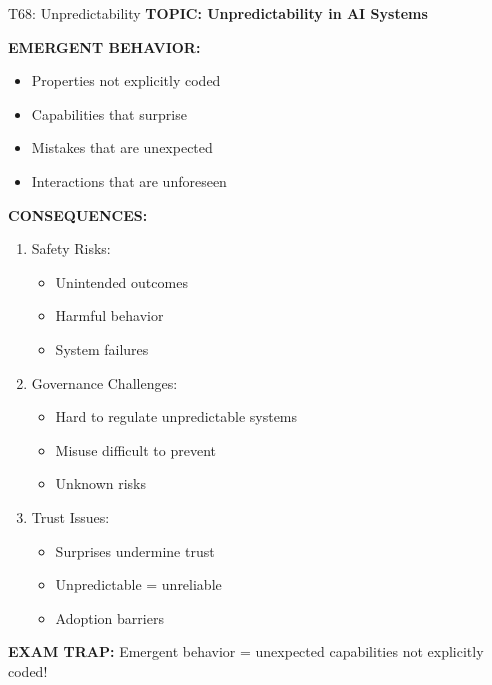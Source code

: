 \documentclass[8pt]{beamer}
\begin{document}
	\begin{frame}{T68: Unpredictability}
		\fontsize{6.5}{7.5}\selectfont
		\textbf{TOPIC: Unpredictability in AI Systems}
		
		\vspace{0.1cm}
		\textbf{EMERGENT BEHAVIOR:}
		\begin{itemize}
			\item Properties not explicitly coded
			\item Capabilities that surprise
			\item Mistakes that are unexpected
			\item Interactions that are unforeseen
		\end{itemize}
		
		\vspace{0.1cm}
		\textbf{CONSEQUENCES:}
		\begin{enumerate}
			\item \textcolor{myblue}{Safety Risks:}
			\begin{itemize}
				\item Unintended outcomes
				\item Harmful behavior
				\item System failures
			\end{itemize}
			\item \textcolor{myblue}{Governance Challenges:}
			\begin{itemize}
				\item Hard to regulate unpredictable systems
				\item Misuse difficult to prevent
				\item Unknown risks
			\end{itemize}
			\item \textcolor{myblue}{Trust Issues:}
			\begin{itemize}
				\item Surprises undermine trust
				\item Unpredictable = unreliable
				\item Adoption barriers
			\end{itemize}
		\end{enumerate}
		
		\textcolor{myred}{\textbf{EXAM TRAP:}} Emergent behavior = \textcolor{myblue}{unexpected capabilities not explicitly coded}!
	\end{frame}
	
\end{document}
